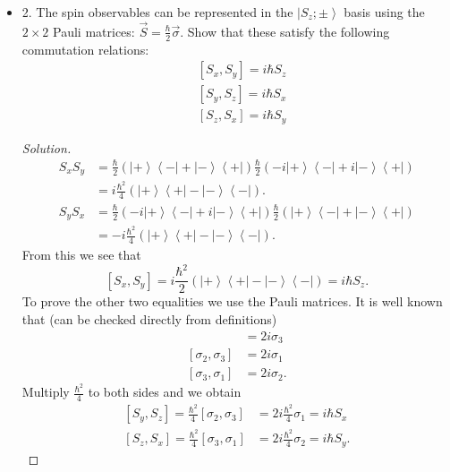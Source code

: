 \begin{itemize}
\begin{proof}[Solution]
	Hence
	\[
		S_y = \frac{\hbar}{2}\left( i \left| - \right\rangle \left\langle + \right|  - i \left| + \right\rangle \left\langle - \right|  \right) 
	.\] 
\end{proof}
\item
2. The spin observables can be represented in the $\left|S_z ; \pm\right\rangle$ basis using the $2 \times 2$ Pauli matrices: $\vec{S}=\frac{\hbar}{2} \vec{\sigma}$. Show that these satisfy the following commutation relations:
\begin{align*}
& {\left[S_x, S_y\right]=i \hbar S_z} \\
& {\left[S_y, S_z\right]=i \hbar S_x} \\
& {\left[S_z, S_x\right]=i \hbar S_y}
\end{align*}

\begin{proof}[Solution]
	\begin{align*}
		S_x S_y &= \frac{\hbar}{2}\left( \left| + \right\rangle \left\langle - \right| + \left| - \right\rangle \left\langle + \right|  \right)  \frac{\hbar}{2} \left( -i \left| + \right\rangle \left\langle - \right| + i \left| - \right\rangle  \left\langle + \right|  \right)  \\
		&= i\frac{\hbar^2}{4} \left( \left| + \right\rangle \left\langle + \right|  - \left| - \right\rangle \left\langle - \right|  \right)
	.\end{align*}
	\begin{align*}
		S_y S_x &=  \frac{\hbar}{2} \left( -i \left| + \right\rangle \left\langle - \right| + i \left| - \right\rangle  \left\langle + \right|  \right) \frac{\hbar}{2}\left( \left| + \right\rangle \left\langle - \right| + \left| - \right\rangle \left\langle + \right|  \right)  \\
		&= -i\frac{\hbar^2}{4} \left( \left| + \right\rangle \left\langle + \right|  - \left| - \right\rangle \left\langle - \right|  \right)
	.\end{align*}
	From this we see that
	\[
		\left[ S_x, S_y \right]  = i \frac{\hbar^2}{2} \left( \left| + \right\rangle \left\langle + \right| - \left| - \right\rangle  \left\langle - \right|  \right) = i \hbar S_z
	.\] 
	To prove the other two equalities we use the Pauli matrices. It is well known that (can be checked directly from definitions)
	\begin{align*}
		[\sigma_1, \sigma_2] &= 2 i \sigma_3\\
		[\sigma_2, \sigma_3] &=  2 i \sigma_1 \\
		[\sigma_3, \sigma_1] &=  2 i \sigma_2
	.\end{align*}
	Multiply $\frac{\hbar^2}{4}$ to both sides and we obtain
	\begin{align*}
		\left[ S_y, S_z \right]  = \frac{\hbar^2}{4} [\sigma_2, \sigma_3] &=  2 i \frac{\hbar^2}{4} \sigma_1 = i \hbar S_x \\
		\left[ S_z, S_x \right] = \frac{\hbar^2}{4}[\sigma_3, \sigma_1] &= 2 i \frac{\hbar^2}{4} \sigma_2 = i \hbar S_y
	.\end{align*}
\end{proof}




\end{itemize}
